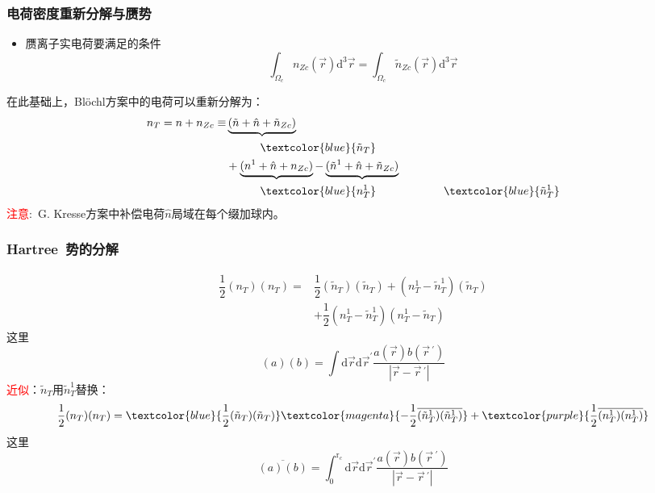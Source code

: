 \frame
{
	\frametitle{电荷密度重新分解与赝势}
\begin{itemize}
	\item 赝离子实电荷要满足的条件$$\int_{\Omega_c}n_{Zc}(\vec r)\mathrm{d}^3\vec r=\int_{\Omega_c}\tilde n_{Zc}(\vec r)\mathrm{d}^3\vec r$$
\end{itemize}
在此基础上，\textrm{Bl\"ochl}方案中的电荷可以重新分解为：
\begin{displaymath}
	\begin{aligned}
		n_T=n+n_{Zc}\equiv&\underbrace{(\tilde n+\hat n+\tilde n_{Zc})}\\
		&\quad\qquad\textcolor{blue}{\tilde n_T}\\
				  &+\underbrace{(n^1+\hat n+n_{Zc})}-\underbrace{(\tilde n^1+\hat n+\tilde n_{Zc})}\\
				  &\quad\qquad \textcolor{blue}{n_T^1}\qquad\qquad\qquad\textcolor{blue}{\tilde n_T^1}
	\end{aligned}
\end{displaymath}
\textcolor{red}{注意}:~\textrm{G. Kresse}方案中补偿电荷$\hat n$局域在每个缀加球内。
}

\frame
{
	\frametitle{\textrm{Hartree~}势的分解}
\begin{displaymath}
	\begin{aligned}
		\dfrac12(n_T)(n_T)=&\dfrac12(\tilde n_T)(\tilde n_T)+(n_T^1-\tilde n_T^1)(\tilde n_T)\\
				&+\dfrac12(n_T^1-\tilde n_T^1)(n_T^1-\tilde n_T)
	\end{aligned}
\end{displaymath}
这里$$(a)(b)=\int\mathrm{d}\vec r\mathrm{d}\vec r^{\prime}\dfrac{a(\vec r)b(\vec r\,^{\prime})}{|\vec r-\vec r\,^{\prime}|}$$
\textcolor{red}{近似}：$\tilde n_T$用$\tilde n_T^1$替换：
\begin{displaymath}
	\dfrac12(n_T)(n_T)=\textcolor{blue}{\dfrac12(\tilde n_T)(\tilde n_T)}\textcolor{magenta}{-\dfrac12\overline{(\tilde n_T^1)(\tilde n_T^1)}}+\textcolor{purple}{\dfrac12\overline{(n_T^1)(n_T^1)}}
\end{displaymath}
这里$$\overline{(a)(b)}=\int_0^{\mathrm{r}_c}\mathrm{d}\vec r\mathrm{d}\vec r^{\prime}\dfrac{a(\vec r)b(\vec r\,^{\prime})}{|\vec r-\vec r\,^{\prime}|}$$
}

